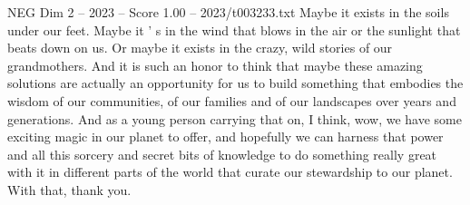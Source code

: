 \begin{textsample}{NEG Dim 2 – 2023 – Score 1.00 – 2023/t003233.txt}
Maybe it exists in the soils under our feet.
Maybe it ' s in the wind that blows in the air or the sunlight that beats down on us.
Or maybe it exists in the crazy, wild stories of our grandmothers.
And it is such an honor to think that maybe these amazing solutions are actually an opportunity for us to build something that embodies the wisdom of our communities, of our families and of our landscapes over years and generations.
And as a young person carrying that on, I think, wow, we have some exciting magic in our planet to offer, and hopefully we can harness that power and all this sorcery and secret bits of knowledge to do something really great with it in different parts of the world that curate our stewardship to our planet.
With that, thank you.

\end{textsample}
